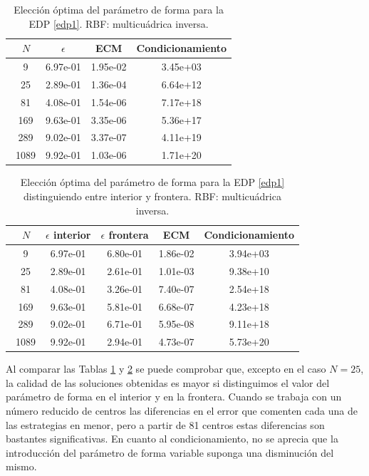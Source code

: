 \documentclass[11pt,a4paper]{article}
\begin{document}
\begin{table}[H]

\centering
\caption{Elección óptima del parámetro de forma para la EDP \ref{edp1}. RBF: multicuádrica inversa.}
\begin{tabular}{|c|ccc|}
\hline
\ $N$ & $\epsilon$ & ECM & Condicionamiento \\
\hline
\ 9 & 6.97e-01 & 1.95e-02 & 3.45e+03 \\
\ 25 & 2.89e-01 & 1.36e-04 & 6.64e+12\\
\ 81&4.08e-01 & 1.54e-06 & 7.17e+18\\
\ 169 & 9.63e-01 & 3.35e-06& 5.36e+17\\
\ 289 & 9.02e-01& 3.37e-07 & 4.11e+19\\
\ 1089 & 9.92e-01 &1.03e-06 & 1.71e+20 \\
\hline
\end{tabular}
\label{ep_optimo}
\end{table}


\begin{table}[H]

\centering
\caption{Elección óptima del parámetro de forma para la EDP \ref{edp1} distinguiendo entre interior y frontera. RBF: multicuádrica inversa.}
\begin{tabular}{|c|cccc|}
\hline
\ $N$ & $\epsilon$ interior &$\epsilon$ frontera&ECM & Condicionamiento \\
\hline
\ 9 & 6.97e-01 & 6.80e-01& 1.86e-02 &3.94e+03 \\
\ 25 & 2.89e-01 &2.61e-01& 1.01e-03 &9.38e+10\\
\ 81& 4.08e-01 &3.26e-01&7.40e-07& 2.54e+18\\
\ 169 & 9.63e-01&5.81e-01 & 6.68e-07& 4.23e+18\\
\ 289 & 9.02e-01& 6.71e-01& 5.95e-08 & 9.11e+18\\
\ 1089 & 9.92e-01&2.94e-01& 4.73e-07 &5.73e+20 \\
\hline

\end{tabular}
\label{ep_variable}
\end{table}
Al comparar las Tablas \ref{ep_optimo} y \ref{ep_variable} se puede comprobar que, excepto en el caso $N=25$, la calidad de las soluciones obtenidas es mayor si distinguimos el valor del parámetro de forma en el interior y en la frontera. Cuando se trabaja con un número reducido de centros las diferencias en el error que comenten cada una de las estrategias en menor, pero a partir de 81 centros estas diferencias son bastantes significativas. En cuanto al condicionamiento, no se aprecia que la introducción del parámetro de forma variable suponga una disminución del mismo. 
\end{document}
